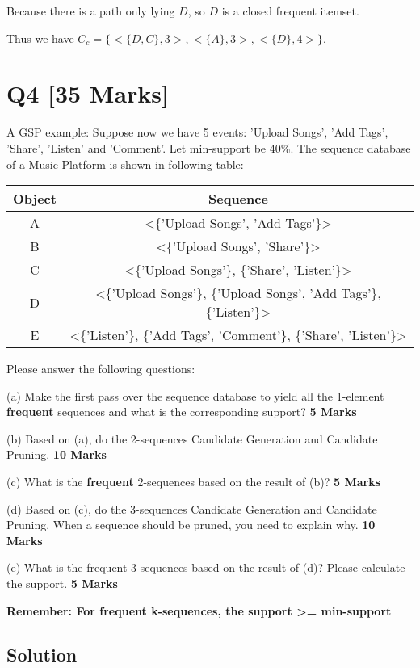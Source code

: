 \documentclass[en,black,normal,10pt]{elegantnote}
\begin{document}
Because there is a path only lying $D$, so $D$ is a closed frequent itemset.

Thus we have $C_c = \{ <\{D, C\},3>, <\{A\},3>, <\{D\},4>\}$. 

\section*{Q4 [35 Marks]}

A GSP example: Suppose now we have 5 events: 'Upload Songs', 'Add Tags', 'Share', 'Listen' and 'Comment'.
Let min-support be 40\%.
The sequence database of a Music Platform is shown in following table:

\begin{tabular}{|c|c|}
  \hline
    \rowcolor{Gray} %
    Object & Sequence \\
    \hline
    A & <\{'Upload Songs', 'Add Tags'\}> \\
    \hline
    B & <\{'Upload Songs', 'Share'\}> \\
    \hline
    C & <\{'Upload Songs'\}, \{'Share', 'Listen'\}> \\
    \hline
    D & <\{'Upload Songs'\}, \{'Upload Songs', 'Add Tags'\}, \{'Listen'\}> \\
    \hline
    E & <\{'Listen'\}, \{'Add Tags', 'Comment'\}, \{'Share', 'Listen'\}> \\
    \hline
\end{tabular}

Please answer the following questions:

(a) Make the first pass over the sequence database to yield all the 1-element \textbf{frequent} sequences and what is the corresponding support? \textbf{5 Marks}

(b) Based on (a), do the 2-sequences Candidate Generation and Candidate Pruning. \textbf{10 Marks}

(c) What is the \textbf{frequent} 2-sequences based on the result of (b)? \textbf{5 Marks}

(d) Based on (c), do the 3-sequences Candidate Generation and Candidate Pruning.
When a sequence should be pruned, you need to explain why. \textbf{10 Marks}

(e) What is the frequent 3-sequences based on the result of (d)?
Please calculate the support. \textbf{5 Marks}

\textbf{Remember: For frequent k-sequences, the support >= min-support}

\subsection*{Solution}
\end{document}
